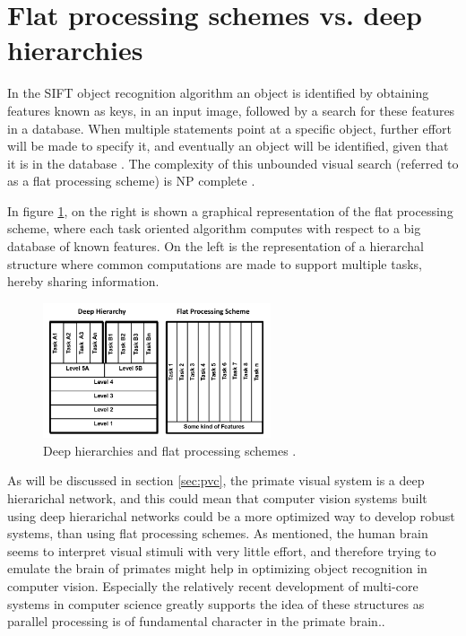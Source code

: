 \section{Flat processing schemes vs. deep hierarchies}
\label{sec:deep_hierarchies}
In the SIFT object recognition algorithm an object is identified
by obtaining features known as keys, in an input image,
followed by a search for these features in a database.
When multiple statements point at a specific object,
further effort will be made to specify it, and eventually an object will be identified,
given that it is in the database \citep{sift}.
The complexity of this unbounded visual search (referred to as a flat processing scheme)
is NP complete \citep{fidler2009learning}.

In figure \ref{fig:deepvsflat}, on the right is shown a graphical representation of the flat processing scheme,
where each task oriented algorithm computes with respect to a big database of known features.
On the left is the representation of a hierarchal structure where common computations are made to support multiple tasks,
hereby sharing information.

\begin{figure}[h!] %
\centering
\includegraphics[width=0.6\textwidth]{graphics/deepvsflat}
\caption[Deep hierarchies and flat processing schemes]{Deep hierarchies and flat processing schemes 
\citep[fig.~1]{kruger2013deep}. } 
\label{fig:deepvsflat}
\end{figure}

As will be discussed in section \ref{sec:pvc}, the primate visual system
is a deep hierarichal network, and this could mean that
computer vision systems built using deep hierarichal networks could
be a more optimized way to develop robust systems, than using flat processing schemes.
As mentioned, the human brain seems to interpret visual stimuli with very little effort,
and therefore trying to emulate the brain of primates might help in optimizing object recognition in computer vision.
Especially the relatively recent development of multi-core systems in computer science
greatly supports the idea of these structures as parallel processing is of fundamental character in the primate brain.\citep{fidler2009learning}.

